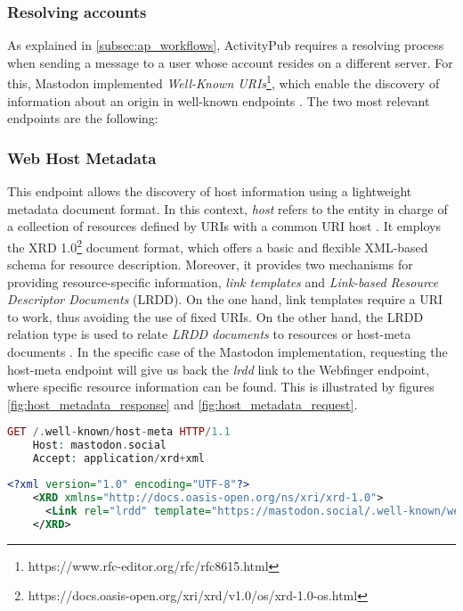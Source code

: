 \subsubsection*{\textbf{Resolving accounts}}
As explained in \ref{subsec:ap_workflows}, ActivityPub requires a resolving process when sending a message to a user whose account resides on a different server. For this, Mastodon implemented \emph{Well-Known URIs}\footnote{https://www.rfc-editor.org/rfc/rfc8615.html}, which enable the discovery of information about an origin in well-known endpoints \cite{nottingham_2019}. The two most relevant endpoints are the following: 

\subsubsection*{Web Host Metadata}
This endpoint allows the discovery of host information using a lightweight metadata document format. In this context, \emph{host} refers to the entity in charge of a collection of resources defined by URIs with a common URI host \cite{cook_2011}. It employs the XRD 1.0\footnote{https://docs.oasis-open.org/xri/xrd/v1.0/os/xrd-1.0-os.html} document format, which offers a basic and flexible XML-based schema for resource description. Moreover, it provides two mechanisms for providing resource-specific information, \emph{link templates} and \emph{Link-based Resource Descriptor Documents} (LRDD). On the one hand, link templates require a URI to work, thus avoiding the use of fixed URIs. On the other hand, the LRDD relation type is used to relate \emph{LRDD documents} to resources or host-meta documents \cite{cook_2011}. In the specific case of the Mastodon implementation, requesting the host-meta endpoint will give us back the \emph{lrdd} link to the Webfinger endpoint, where specific resource information can be found. This is illustrated by figures \ref{fig:host_metadata_response} and \ref{fig:host_metadata_request}.

\lstset{style=JSONStyle}
\begin{lstlisting}[language=PHP, caption=Web Host Metadata request to mastodon.social, label=fig:host_metadata_request, float=ht]
    GET /.well-known/host-meta HTTP/1.1
    Host: mastodon.social
    Accept: application/xrd+xml
\end{lstlisting}

\lstset{style=JSONStyle}
\begin{lstlisting}[language=XML, caption=Web Host metadata response from mastodon.social, label=fig:host_metadata_response, float=h!]
    <?xml version="1.0" encoding="UTF-8"?>
    <XRD xmlns="http://docs.oasis-open.org/ns/xri/xrd-1.0">
      <Link rel="lrdd" template="https://mastodon.social/.well-known/webfinger?resource={uri}"/>
    </XRD>
\end{lstlisting}

